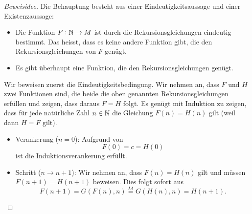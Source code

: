 \begin{proof}[Beweisidee]
    Die Behauptung besteht aus einer Eindeutigkeitsaussage und einer Existenzaussage:
    \begin{itemize}
        \item Die Funktion $F:\mathbb{N}\to M$ ist durch die Rekursionsgleichungen eindeutig bestimmt. Das heisst, dass es keine andere  Funktion gibt, die den Rekursionsgleichungen von $F$ genügt.
        \item Es gibt überhaupt eine Funktion, die den Rekursionsgleichungen genügt.
    \end{itemize}
    Wir beweisen zuerst die Eindeutigkeitsbedingung. Wir nehmen an, dass $F$ und $H$ zwei Funktionen sind, die beide die oben genannten Rekursionsgleichungen erfüllen und zeigen, dass daraus $F=H$ folgt. Es genügt mit Induktion zu zeigen, dass für jede natürliche Zahl $n\in \mathbb{N}$ die Gleichung $F(n)=H(n)$ gilt (weil dann $H=F$ gilt).
    \begin{itemize}
        \item Verankerung ($n=0$): Aufgrund von
            \[
                F(0)=c=H(0)
            \]
            ist die Induktionsverankerung erfüllt.
        \item Schritt ($n\to n+1$): Wir nehmen an, dass $F(n)=H(n)$ gilt und müssen $F(n+1)=H(n+1)$ beweisen. Dies folgt sofort aus
            \[
                F(n+1)=G(F(n),n)\stackrel{IA}{=}G(H(n),n)=H(n+1).
            \]
    \end{itemize}
\end{proof}


